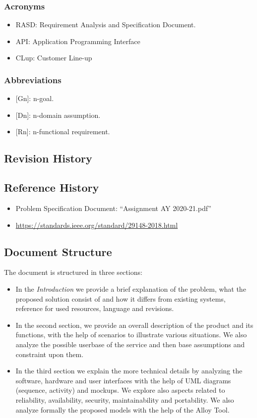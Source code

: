 \subsubsection{Acronyms}
\begin{itemize}
    \item RASD: Requirement Analysis and Specification Document.
    \item API: Application Programming Interface
    \item CLup: Customer Line-up
\end{itemize}


\subsubsection{Abbreviations}
\begin{itemize}
    \item {[Gn]}: n-goal.
    \item {[Dn]}: n-domain assumption.
    \item {[Rn]}: n-functional requirement.
\end{itemize}

\subsection{Revision History}
\subsection{Reference History}
\begin{itemize}
    \item Problem Specification Document: ``Assignment AY 2020-21.pdf''
    \item \url{https://standards.ieee.org/standard/29148-2018.html}
\end{itemize}
\subsection{Document Structure}

The document is structured in three sections:

\begin{itemize}
    \item In the \emph{Introduction} we provide a brief explanation of the problem, what the proposed solution
        consist of and how it differs from existing systems, reference for used resources, language and revisions.
    \item In the second section, we provide an overall description of the product and its functions, with the help
    of scenarios to illustrate various situations. We also analyze the possible userbase of the service and then base
    assumptions and constraint upon them.
    \item In the third section we explain the more technical details by analyzing the software, hardware and user interfaces
    with the help of UML diagrams (sequence, activity) and mockups.
    We explore also aspects related to reliability, availability, security, maintainability and portability.
    We also analyze formally the proposed models with the help of the Alloy Tool.
\end{itemize}
